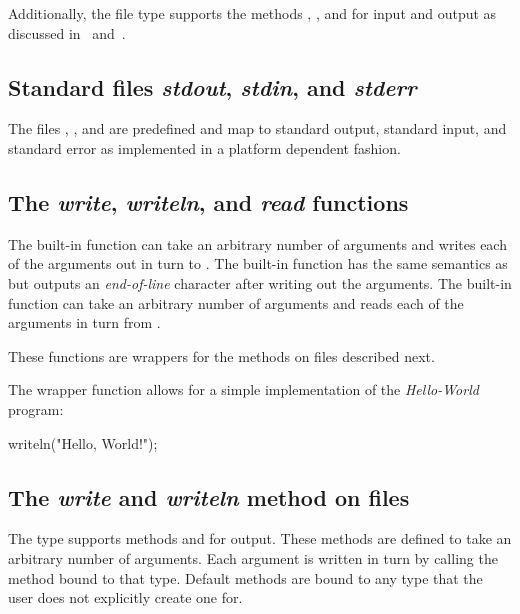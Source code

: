 Additionally, the file type supports the
methods , , and  for input and
output as discussed in~ and~.

\subsection{Standard files {\em stdout}, {\em stdin}, and {\em stderr}}

The files , , and  are
predefined and map to standard output, standard input, and standard
error as implemented in a platform dependent fashion.

\subsection{The {\em write}, {\em writeln}, and {\em read} functions}

The built-in function  can take an arbitrary number of
arguments and writes each of the arguments out in turn
to .  The built-in function  has the same
semantics as  but outputs an {\em end-of-line} character
after writing out the arguments.  The built-in function 
can take an arbitrary number of arguments and reads each of the
arguments in turn from .

These functions are wrappers for the methods on files described next.

\begin{example}
The  wrapper function allows for a simple implementation
of the {\em Hello-World} program:
\begin{chapel}
writeln("Hello, World!");
\end{chapel}
\end{example}

\subsection{The {\em write} and {\em writeln} method on files}
\label{filewrite}

The  type supports methods  and 
for output.  These methods are defined to take an arbitrary number of
arguments.  Each argument is written in turn by calling
the  method bound to that type.  Default 
methods are bound to any type that the user does not explicitly create
one for.


